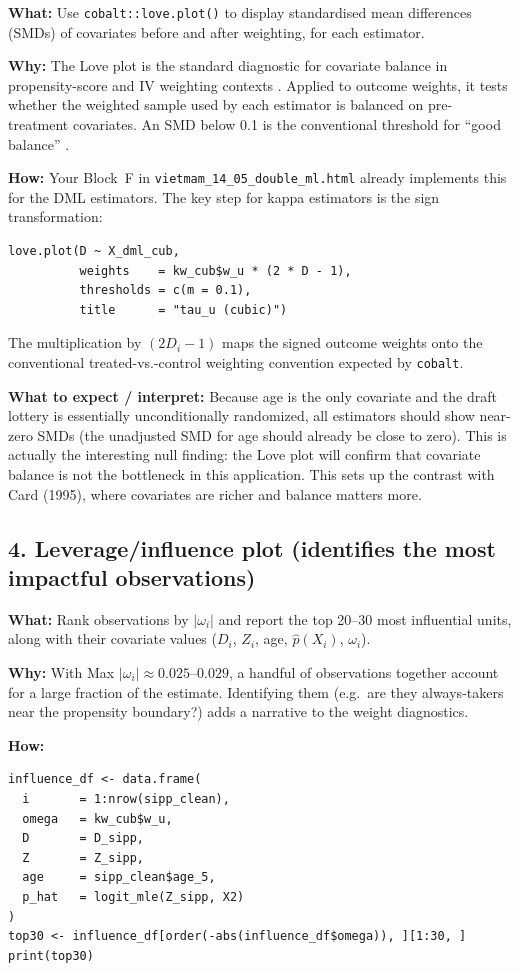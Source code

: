 \documentclass[12pt, a4paper]{article}
\begin{document}
\textbf{What:} Use \texttt{cobalt::love.plot()} to display standardised mean
differences (SMDs) of covariates before and after weighting, for each
estimator.

\textbf{Why:} The Love plot is the standard diagnostic for covariate balance
in propensity-score and IV weighting contexts \citep{austin2015moving}.
Applied to outcome weights, it tests whether the weighted sample used by each
estimator is balanced on pre-treatment covariates. An SMD below 0.1 is the
conventional threshold for ``good balance'' \citep{austin2009using}.

\textbf{How:} Your Block~F in \texttt{vietmam\_14\_05\_double\_ml.html}
already implements this for the DML estimators. The key step for kappa
estimators is the sign transformation:
\begin{verbatim}
love.plot(D ~ X_dml_cub,
          weights    = kw_cub$w_u * (2 * D - 1),
          thresholds = c(m = 0.1),
          title      = "tau_u (cubic)")
\end{verbatim}
The multiplication by $(2D_i - 1)$ maps the signed outcome weights onto the
conventional treated-vs.-control weighting convention expected by
\texttt{cobalt}.

\textbf{What to expect / interpret:} Because age is the only covariate and
the draft lottery is essentially unconditionally randomized, all estimators
should show near-zero SMDs (the unadjusted SMD for age should already be
close to zero). This is actually the interesting null finding: the Love plot
will confirm that covariate balance is not the bottleneck in this application.
This sets up the contrast with Card (1995), where covariates are richer and
balance matters more.

\subsection*{4. Leverage/influence plot (identifies the most impactful observations)}

\textbf{What:} Rank observations by $|\omega_i|$ and report the top 20--30
most influential units, along with their covariate values ($D_i$, $Z_i$,
age, $\hat{p}(X_i)$, $\omega_i$).

\textbf{Why:} With Max $|\omega_i| \approx 0.025$--$0.029$, a handful of
observations together account for a large fraction of the estimate.
Identifying them (e.g.\ are they always-takers near the propensity boundary?)
adds a narrative to the weight diagnostics.

\textbf{How:}
\begin{verbatim}
influence_df <- data.frame(
  i       = 1:nrow(sipp_clean),
  omega   = kw_cub$w_u,
  D       = D_sipp,
  Z       = Z_sipp,
  age     = sipp_clean$age_5,
  p_hat   = logit_mle(Z_sipp, X2)
)
top30 <- influence_df[order(-abs(influence_df$omega)), ][1:30, ]
print(top30)
\end{verbatim}
\end{document}
